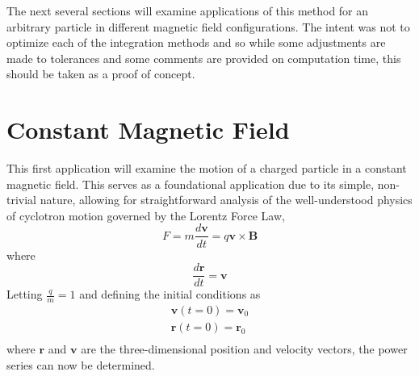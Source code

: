 \documentclass{article}
\begin{document}
The next several sections will examine applications of this method for an arbitrary particle in different magnetic field configurations. The intent was not to optimize each of the integration methods and so while some adjustments are made to tolerances and some comments are provided on computation time, this should be taken as a proof of concept. 
\section{Constant Magnetic Field}
This first application will examine the motion of a charged particle in a constant magnetic field. This serves as a foundational application due to its simple, non-trivial nature, allowing for straightforward analysis of the well-understood physics of cyclotron motion governed by the Lorentz Force Law,  
    \begin{equation} \label{eq:2.4} 
        F=m\frac{d\mathbf{v}}{dt}=q\mathbf{v}\times\mathbf{B}
    \end{equation}
where
    \begin{equation}  \label{eq:2.1}
        \frac{d\mathbf{r}}{dt}=\mathbf{v}
    \end{equation}
Letting $\frac{q}{m}=1$ and defining the initial conditions as 
    \begin{equation}
        \begin{split}
            \mathbf{v}(t=0)=\mathbf{v}_0\\
            \mathbf{r}(t=0)=\mathbf{r}_0\\
        \end{split}
    \end{equation}
where $\mathbf{r}$ and $\mathbf{v}$ are the three-dimensional position and velocity vectors, the power series can now be determined.
\end{document}

